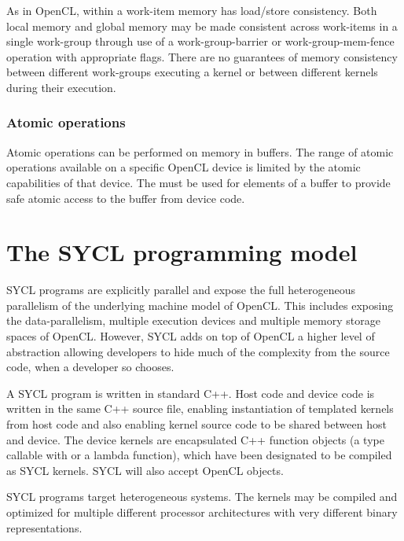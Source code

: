 As in OpenCL, within a work-item memory has load/store consistency. Both local
memory and global memory may be made consistent across work-items in a single
work-group through use of a \gls{work-group-barrier} or \gls{work-group-mem-fence} operation with appropriate flags. There are no guarantees of memory consistency between different work-groups executing a kernel or between different kernels during their execution.

\subsubsection{Atomic operations}

Atomic operations can be performed on memory in buffers. The range of
atomic operations available on a specific OpenCL device is limited by
the atomic capabilities of that device.  The
 must be used for elements of a buffer
to provide safe atomic access to the buffer from device code.

\section{The SYCL programming model}

SYCL programs are explicitly parallel and expose the full heterogeneous
parallelism of the underlying machine model of OpenCL. This includes exposing
the data-parallelism, multiple execution devices and multiple memory storage
spaces of OpenCL. However, SYCL adds on top of OpenCL a higher level of
abstraction allowing developers to hide much of the complexity from the source
code, when a developer so chooses.

A SYCL program is written in standard C++. Host code and device code is
written in the same C++ source file, enabling instantiation of templated
kernels from host code and also enabling kernel source code to be shared
between host and device.
The device kernels are encapsulated C++ function objects (a
type callable with  or a lambda function), which have
been designated to be compiled as SYCL kernels. SYCL will
also accept OpenCL  objects.

SYCL programs target heterogeneous systems. The kernels may be compiled and
optimized for multiple different processor architectures with very different
binary representations.

